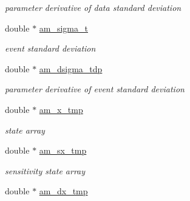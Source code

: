 \begin{DoxyCompactItemize}
\begin{DoxyCompactList}\small\item\em parameter derivative of data standard deviation \end{DoxyCompactList}\item 
\hypertarget{struct_temp_data_a6b326ec16453b4518b549856f913acbf}{}double $\ast$ \hyperlink{struct_temp_data_a6b326ec16453b4518b549856f913acbf}{am\+\_\+sigma\+\_\+t}\label{struct_temp_data_a6b326ec16453b4518b549856f913acbf}

\begin{DoxyCompactList}\small\item\em event standard deviation \end{DoxyCompactList}\item 
\hypertarget{struct_temp_data_a70d1dd9123f113a231825d6d58c92550}{}double $\ast$ \hyperlink{struct_temp_data_a70d1dd9123f113a231825d6d58c92550}{am\+\_\+dsigma\+\_\+tdp}\label{struct_temp_data_a70d1dd9123f113a231825d6d58c92550}

\begin{DoxyCompactList}\small\item\em parameter derivative of event standard deviation \end{DoxyCompactList}\item 
\hypertarget{struct_temp_data_ab741ac82e5272750a751572dff03daf9}{}double $\ast$ \hyperlink{struct_temp_data_ab741ac82e5272750a751572dff03daf9}{am\+\_\+x\+\_\+tmp}\label{struct_temp_data_ab741ac82e5272750a751572dff03daf9}

\begin{DoxyCompactList}\small\item\em state array \end{DoxyCompactList}\item 
\hypertarget{struct_temp_data_a36291523c0547b6a1086910461d13569}{}double $\ast$ \hyperlink{struct_temp_data_a36291523c0547b6a1086910461d13569}{am\+\_\+sx\+\_\+tmp}\label{struct_temp_data_a36291523c0547b6a1086910461d13569}

\begin{DoxyCompactList}\small\item\em sensitivity state array \end{DoxyCompactList}\item 
\hypertarget{struct_temp_data_a9bf7d112aa52d056192983f55fff2eaf}{}double $\ast$ \hyperlink{struct_temp_data_a9bf7d112aa52d056192983f55fff2eaf}{am\+\_\+dx\+\_\+tmp}\label{struct_temp_data_a9bf7d112aa52d056192983f55fff2eaf}


\end{DoxyCompactItemize}
